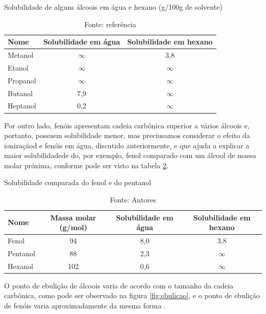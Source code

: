 \begin{table}[!h]
	\begin{center}
	\caption{\label{solubilidade}Solubilidade de alguns álcoois em água e hexano (g/100g de solvente)\cite{solubilidade}}
	\vspace{0.5cm}
	\begin{tabular}{l c c}
	\hline
	Nome & Solubilidade em água & Solubilidade em hexano\\
	\hline
	Metanol & $\infty$ & 3,8\\
	Etanol & $\infty$ & $\infty$\\
    Propanol & $\infty$ & $\infty$\\
	Butanol & 7,9 & $\infty$\\
	Heptanol & 0,2 & $\infty$\\
    \hline
	\end{tabular}
	\end{center}
	\caption*{Fonte: referência \cite{solubilidade}}
\end{table}

Por outro lado, fenóis apresentam cadeia carbônica superior a vários álcoois e, portanto, possuem solubilidade menor, mas preciusamos considerar o efeito da ionizaçãod e fenóis em água, discutido anteriormente, e que ajuda a explicar a maior solubilidadede do, por exemplo, fenol comparado com um álcool de massa molar próxima, conforme pode ser visto na tabela \ref{comparada}.

\begin{table}[!h]
	\begin{center}
	\caption{\label{comparada}Solubilidade comparada do fenol e do pentanol}
	\vspace{0.5cm}
	\begin{tabular}{l c c c}
	\hline
	Nome & Massa molar (g/mol) &Solubilidade em água & Solubilidade em hexano\\
	\hline
	Fenol & 94 & 8,0 & 3,8\\
	Pentanol & 88 & 2,3 & $\infty$\\
	Hexanol & 102 & 0,6 & $\infty$\\
    \hline
	\end{tabular}
	\end{center}
	\caption*{Fonte: Autores}
\end{table}

O ponto de ebulição de álcoois varia de acordo com o tamanho da cadeia carbônica, como pode ser observado na figura \ref{fig:ebulicao}, e o ponto de ebulição de fenóis varia aproximadamente da mesma forma \cite{fisicas}.

